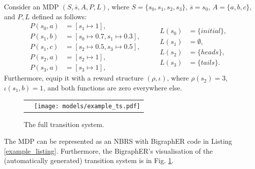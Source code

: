 \documentclass[runningheads]{llncs}
\begin{document}
\begin{example} \label{example}
  Consider an MDP $(S, \overline{s}, A, P, L)$, where $S = \{ s_0, s_1, s_2, s_3
  \}$, $\overline{s} = s_0$, $A = \{ a, b, c \}$, and $P, L$ defined as follows:
  \begin{equation*}
    \begin{split}
      P(s_0, a) &= [s_1 \mapsto 1], \\
      P(s_1, b) &= [s_0 \mapsto 0.7, s_1 \mapsto 0.3], \\
      P(s_1, c) &= [s_2 \mapsto 0.5, s_3 \mapsto 0.5], \\
      P(s_2, a) &= [s_2 \mapsto 1], \\
      P(s_3, a) &= [s_3 \mapsto 1],
    \end{split}
    \qquad
    \begin{split}
      L(s_0) &= \{ initial \}, \\
      L(s_1) &= \emptyset, \\
      L(s_2) &= \{ heads \}, \\
      L(s_3) &= \{ tails \}.
    \end{split}
  \end{equation*}
  Furthermore, equip it with a reward structure $(\rho, \iota)$, where
  $\rho(s_2) = 3$, $\iota(s_1, b) = 1$, and both functions are zero everywhere
  else.
\end{example}

\begin{figure}
  \begin{tabular}{p{}p{}}
    \begin{minipage}{0.5\textwidth}
      \vspace{13mm}
      
    \end{minipage}
    &
      \begin{minipage}{0.5\textwidth}
        \centering
        \texttt{[image: models/example\_ts.pdf]}
        \caption{The full transition system.}
        \label{example_ts}
      \end{minipage}
  \end{tabular}
\end{figure}

The MDP can be represented as an NBRS with BigraphER code in Listing
\ref{example_listing}. Furthermore, the BigraphER's visualisation of the
(automatically generated) transition system is in Fig. \ref{example_ts}.
\end{document}
